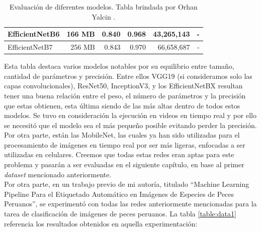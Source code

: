 \begin{table}[h!]
\begin{tabular}{|l|r|r|r|r|r|}
    EfficientNetB6                                               & 166 MB                             & 0.840                                                                                   & 0.968                                                                                   & 43,265,143                               & -                                   \\ \hline
    EfficientNetB7                                               & 256 MB                             & 0.843                                                                                   & 0.970                                                                                   & 66,658,687                               & -                                   \\ \hline
    \end{tabular}
    \caption{Evaluación de diferentes modelos. Tabla brindada por Orhan Yalcin \protect\cite{DataModelos}. }
    \label{evaluación}
\end{table}

Esta tabla destaca varios modelos notables por su equilibrio entre 
tamaño, cantidad de parámetros y precisión. Entre ellos VGG19 
(si consideramos solo las capas convolucionales), ResNet50, InceptionV3, 
y los EfficientNetBX resultan tener una buena relación entre el peso, el 
número de parámetros y la precisión que estas obtienen, esta última 
siendo de las más altas dentro de todos estos modelos. Se tuvo en 
consideración la ejecución en videos en tiempo real y por ello se necesitó 
que el modelo sea el más pequeño posible evitando perder la precisión. Por 
otra parte, están las MobileNet, las cuales ya han sido utilizadas para el 
procesamiento de imágenes en tiempo real por ser más ligeras, enfocadas a 
ser utilizadas en celulares. Creemos que todas estas redes eran aptas para 
este problema y pasarán a ser evaluadas en el siguiente capítulo, en base 
al primer \textit{dataset} mencionado anteriormente. \\

Por otra parte, en un trabajo previo de mi autoría, titulado ``Machine 
Learning Pipeline Para el Etiquetado Automático en Imágenes de Especies de 
Peces Peruanos''\cite{Madera2024}, se experimentó con todas las 
redes anteriormente mencionadas para la tarea de clasificación de imágenes 
de peces peruanos. La tabla \ref{table:data1} referencia los resultados 
obtenidos en aquella experimentación:

